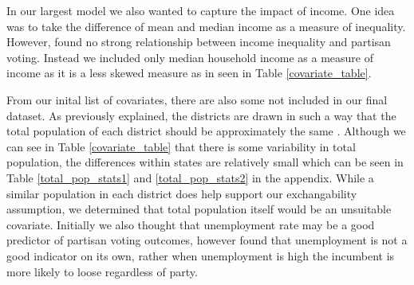 \documentclass[12pt]{article}
\newcommand{\blue}[1]{\textcolor{blue}{#1}}
\begin{document}
In our largest model we also wanted to capture the impact of income. One idea was to take the difference of mean and median income as a measure of inequality. However, \cite{gelman2010income} found no strong relationship between income inequality and partisan voting. Instead we included only median household income as a measure of income as it is a less skewed measure as in seen in Table \ref{covariate_table}.


From our inital list of covariates, there are also some not included in our final dataset. As previously explained, the districts are drawn in such a way that the total population of each district should be approximately the same \parencite{us_elections}. Although we can see in Table \ref{covariate_table} that there is some variability in total population, the differences within states are relatively small which can be seen in Table \ref{total_pop_stats1} and \ref{total_pop_stats2} in the appendix. While a similar population in each district does help support our exchangability assumption, we determined that total population itself would be an unsuitable covariate. Initially we also thought that unemployment rate may be a good predictor of partisan voting outcomes, however \cite{park2020unemployment} found that unemployment is not a good indicator on its own, rather when unemployment is high the incumbent is more likely to loose regardless of party\parencite{park2020unemployment}. 

\end{document}
